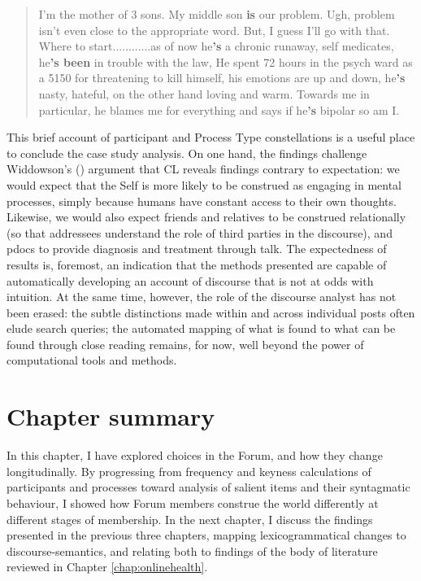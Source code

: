 \begin{quote}
\small
\singlespacing
I'm the mother of 3 sons. My middle son \textbf{is} our problem. Ugh, problem isn't even close to the appropriate word. But, I guess I'll go with that. Where to start............as of now he\textbf{'s} a chronic runaway, self medicates, he\textbf{'s been} in trouble with the law, He spent 72 hours in the psych ward as a 5150 for threatening to kill himself, his emotions are up and down, he\textbf{'s} nasty, hateful, on the other hand loving and warm. Towards me in particular, he blames me for everything and says if he\textbf{'s} bipolar so am I. 
\end{quote}
%
This brief account of participant and Process Type constellations is a useful place to conclude the case study analysis. On one hand, the findings challenge Widdowson's (\citeyear{widdowson_limitations_2000}) argument that \gls{CL} reveals findings contrary to expectation: we would expect that the Self is more likely to be construed as engaging in mental processes, simply because humans have constant access to their own thoughts. Likewise, we would also expect friends and relatives to be construed relationally (so that addressees understand the role of third parties in the discourse), and pdocs to provide diagnosis and treatment through talk. The expectedness of results is, foremost, an indication that the methods presented are capable of automatically developing an account of discourse that is not at odds with intuition. At the same time, however, the role of the discourse analyst has not been erased: the subtle distinctions made within and across individual \glspl{post} often elude search queries; the automated mapping of what is found to what can be found through close reading remains, for now, well beyond the power of computational tools and methods.

\section{Chapter summary}

In this chapter, I have explored  choices in the \gls{Forum}, and how they change longitudinally. By progressing from frequency and keyness calculations of participants and processes toward analysis of salient items and their syntagmatic behaviour, I showed how \gls{Forum} members construe the world differently at different stages of membership. In the next chapter, I discuss the findings presented in the previous three chapters, mapping lexicogrammatical changes to \glspl{discourse-semantic}, and relating both to findings of the body of literature reviewed in Chapter \ref{chap:onlinehealth}.

